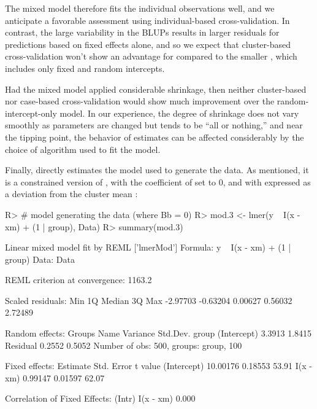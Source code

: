 \documentclass[
]{jss}
\begin{document}
The mixed model  therefore fits the individual observations
well, and we anticipate a favorable assessment using individual-based
cross-validation. In contrast, the large variability in the BLUPs
results in larger residuals for predictions based on fixed effects
alone, and so we expect that cluster-based cross-validation won't show
an advantage for  compared to the smaller ,
which includes only fixed and random intercepts.

Had the mixed model applied considerable shrinkage, then neither
cluster-based nor case-based cross-validation would show much
improvement over the random-intercept-only model. In our experience, the
degree of shrinkage does not vary smoothly as parameters are changed but
tends to be ``all or nothing,'' and near the tipping point, the behavior
of estimates can be affected considerably by the choice of algorithm
used to fit the model.

Finally,  directly estimates the model used to generate the
data. As mentioned, it is a constrained version of , with
the coefficient of  set to 0, and with  expressed as a
deviation from the cluster mean :

\begin{CodeChunk}
\begin{CodeInput}
R> # model generating the data (where Bb = 0)
R> mod.3 <- lmer(y ~ I(x - xm) + (1 | group), Data)
R> summary(mod.3)
\end{CodeInput}
\begin{CodeOutput}
Linear mixed model fit by REML ['lmerMod']
Formula: y ~ I(x - xm) + (1 | group)
   Data: Data

REML criterion at convergence: 1163.2

Scaled residuals: 
     Min       1Q   Median       3Q      Max 
-2.97703 -0.63204  0.00627  0.56032  2.72489 

Random effects:
 Groups   Name        Variance Std.Dev.
 group    (Intercept) 3.3913   1.8415  
 Residual             0.2552   0.5052  
Number of obs: 500, groups:  group, 100

Fixed effects:
            Estimate Std. Error t value
(Intercept) 10.00176    0.18553   53.91
I(x - xm)    0.99147    0.01597   62.07

Correlation of Fixed Effects:
          (Intr)
I(x - xm) 0.000 
\end{CodeOutput}
\end{CodeChunk}
\end{document}
